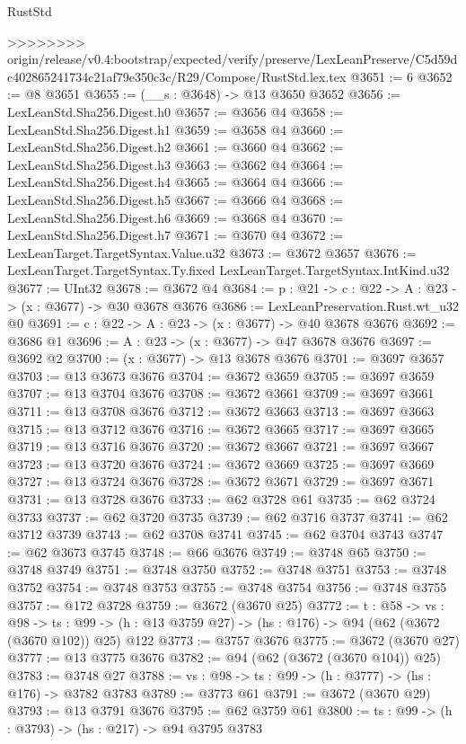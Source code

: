 \begin{lexlean}{RustStd}
\begin{coremodule}
{\begin{coremodule}
{{{{{{{{{>>>>>>>> origin/release/v0.4:bootstrap/expected/verify/preserve/LexLeanPreserve/C5d59dc402865241734c21af79e350c3c/R29/Compose/RustStd.lex.tex
@3651 := 6
@3652 := @8 @3651
@3655 := (__s : @3648) -> @13 @3650 @3652
@3656 := LexLeanStd.Sha256.Digest.h0
@3657 := @3656 @4
@3658 := LexLeanStd.Sha256.Digest.h1
@3659 := @3658 @4
@3660 := LexLeanStd.Sha256.Digest.h2
@3661 := @3660 @4
@3662 := LexLeanStd.Sha256.Digest.h3
@3663 := @3662 @4
@3664 := LexLeanStd.Sha256.Digest.h4
@3665 := @3664 @4
@3666 := LexLeanStd.Sha256.Digest.h5
@3667 := @3666 @4
@3668 := LexLeanStd.Sha256.Digest.h6
@3669 := @3668 @4
@3670 := LexLeanStd.Sha256.Digest.h7
@3671 := @3670 @4
@3672 := LexLeanTarget.TargetSyntax.Value.u32
@3673 := @3672 @3657
@3676 := LexLeanTarget.TargetSyntax.Ty.fixed LexLeanTarget.TargetSyntax.IntKind.u32
@3677 := UInt32
@3678 := @3672 @4
@3684 := {p : @21} -> {c : @22} -> {A : @23} -> (x : @3677) -> @30 @3678 @3676
@3686 := LexLeanPreservation.Rust.wt_u32 @0
@3691 := {c : @22} -> {A : @23} -> (x : @3677) -> @40 @3678 @3676
@3692 := @3686 @1
@3696 := {A : @23} -> (x : @3677) -> @47 @3678 @3676
@3697 := @3692 @2
@3700 := (x : @3677) -> @13 @3678 @3676
@3701 := @3697 @3657
@3703 := @13 @3673 @3676
@3704 := @3672 @3659
@3705 := @3697 @3659
@3707 := @13 @3704 @3676
@3708 := @3672 @3661
@3709 := @3697 @3661
@3711 := @13 @3708 @3676
@3712 := @3672 @3663
@3713 := @3697 @3663
@3715 := @13 @3712 @3676
@3716 := @3672 @3665
@3717 := @3697 @3665
@3719 := @13 @3716 @3676
@3720 := @3672 @3667
@3721 := @3697 @3667
@3723 := @13 @3720 @3676
@3724 := @3672 @3669
@3725 := @3697 @3669
@3727 := @13 @3724 @3676
@3728 := @3672 @3671
@3729 := @3697 @3671
@3731 := @13 @3728 @3676
@3733 := @62 @3728 @61
@3735 := @62 @3724 @3733
@3737 := @62 @3720 @3735
@3739 := @62 @3716 @3737
@3741 := @62 @3712 @3739
@3743 := @62 @3708 @3741
@3745 := @62 @3704 @3743
@3747 := @62 @3673 @3745
@3748 := @66 @3676
@3749 := @3748 @65
@3750 := @3748 @3749
@3751 := @3748 @3750
@3752 := @3748 @3751
@3753 := @3748 @3752
@3754 := @3748 @3753
@3755 := @3748 @3754
@3756 := @3748 @3755
@3757 := @172 @3728
@3759 := @3672 (@3670 @25)
@3772 := {t : @58} ->
  {vs : @98} ->
  {ts : @99} -> (h : @13 @3759 @27) -> (hs : @176) -> @94 (@62 (@3672 (@3670 @102)) @25) @122
@3773 := @3757 @3676
@3775 := @3672 (@3670 @27)
@3777 := @13 @3775 @3676
@3782 := @94 (@62 (@3672 (@3670 @104)) @25)
@3783 := @3748 @27
@3788 := {vs : @98} -> {ts : @99} -> (h : @3777) -> (hs : @176) -> @3782 @3783
@3789 := @3773 @61
@3791 := @3672 (@3670 @29)
@3793 := @13 @3791 @3676
@3795 := @62 @3759 @61
@3800 := {ts : @99} -> (h : @3793) -> (hs : @217) -> @94 @3795 @3783
}}}}}}}}}
\end{coremodule}}
\end{coremodule}
\end{lexlean}

